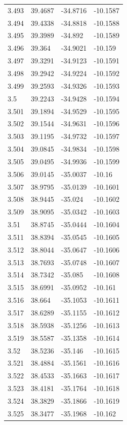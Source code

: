 \begin{tabular}{llll}
3.493 & 39.4687 & -34.8716 & -10.1587 \\
3.494 & 39.4338 & -34.8818 & -10.1588 \\
3.495 & 39.3989 & -34.892 & -10.1589 \\
3.496 & 39.364 & -34.9021 & -10.159 \\
3.497 & 39.3291 & -34.9123 & -10.1591 \\
3.498 & 39.2942 & -34.9224 & -10.1592 \\
3.499 & 39.2593 & -34.9326 & -10.1593 \\
3.5 & 39.2243 & -34.9428 & -10.1594 \\
3.501 & 39.1894 & -34.9529 & -10.1595 \\
3.502 & 39.1544 & -34.9631 & -10.1596 \\
3.503 & 39.1195 & -34.9732 & -10.1597 \\
3.504 & 39.0845 & -34.9834 & -10.1598 \\
3.505 & 39.0495 & -34.9936 & -10.1599 \\
3.506 & 39.0145 & -35.0037 & -10.16 \\
3.507 & 38.9795 & -35.0139 & -10.1601 \\
3.508 & 38.9445 & -35.024 & -10.1602 \\
3.509 & 38.9095 & -35.0342 & -10.1603 \\
3.51 & 38.8745 & -35.0444 & -10.1604 \\
3.511 & 38.8394 & -35.0545 & -10.1605 \\
3.512 & 38.8044 & -35.0647 & -10.1606 \\
3.513 & 38.7693 & -35.0748 & -10.1607 \\
3.514 & 38.7342 & -35.085 & -10.1608 \\
3.515 & 38.6991 & -35.0952 & -10.161 \\
3.516 & 38.664 & -35.1053 & -10.1611 \\
3.517 & 38.6289 & -35.1155 & -10.1612 \\
3.518 & 38.5938 & -35.1256 & -10.1613 \\
3.519 & 38.5587 & -35.1358 & -10.1614 \\
3.52 & 38.5236 & -35.146 & -10.1615 \\
3.521 & 38.4884 & -35.1561 & -10.1616 \\
3.522 & 38.4533 & -35.1663 & -10.1617 \\
3.523 & 38.4181 & -35.1764 & -10.1618 \\
3.524 & 38.3829 & -35.1866 & -10.1619 \\
3.525 & 38.3477 & -35.1968 & -10.162 \\

\end{tabular}
